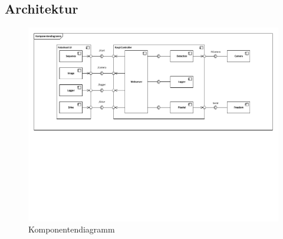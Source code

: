 \subsection{Architektur}

\begin{figure}
\centering
\includegraphics[width=\linewidth]{../../fig/komponentendiagramm}
\caption{Komponentendiagramm}
\label{fig:komponentendiagramm}
\end{figure}
